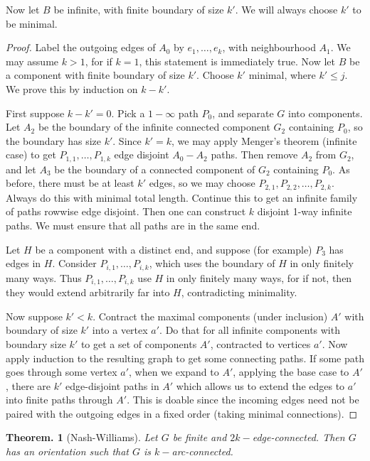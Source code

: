 \documentclass[11pt, a4paper]{memoir}
\theoremstyle{change}
\newtheorem{theorem}{Theorem.}[section]
\theoremstyle{plain}
\theoremstyle{nonumberplain}
\newtheorem{proof}{Proof}
\numberwithin{equation}{section}
\begin{document}
Now let $B$ be infinite, with finite boundary of size $k'$.
We will always choose $k'$ to be minimal.
\begin{proof}
    Label the outgoing edges of $A_0$ by $e_1,\ldots,e_k$, with neighbourhood $A_1$.
    We may assume $k>1$, for if $k=1$, this statement is immediately true.
    Now let $B$ be a component with finite boundary of size $k'$.
    Choose $k'$ minimal, where $k'\leq j$.
    We prove this by induction on $k-k'$.

    First suppose $k-k'=0$.
    Pick a $1-\infty$ path $P_0$, and separate $G$ into components.
    Let $A_2$ be the boundary of the infinite connected component $G_2$ containing $P_0$, so the boundary has size $k'$.
    Since $k'=k$, we may apply Menger's theorem (infinite case) to get $P_{1,1},\ldots,P_{1,k}$ edge disjoint $A_0-A_2$ paths.
    Then remove $A_2$ from $G_2$, and let $A_3$ be the boundary of a connected component of $G_2$ containing $P_0$.
    As before, there must be at least $k'$ edges, so we may choose $P_{2,1},P_{2,2},\ldots,P_{2,k}$.
    Always do this with minimal total length.
    Continue this to get an infinite family of paths rowwise edge disjoint.
    Then one can construct $k$ disjoint 1-way infinite paths.
    We must ensure that all paths are in the same end.

    Let $H$ be a component with a distinct end, and suppose (for example) $P_3$ has edges in $H$.
    Consider $P_{i,1},\ldots,P_{i,k}$, which uses the boundary of $H$ in only finitely many ways.
    Thus $P_{i,1},\ldots,P_{i,k}$ use $H$ in only finitely many ways, for if not, then they would extend arbitrarily far into $H$, contradicting minimality.

    Now suppose $k'<k$.
    Contract the maximal components (under inclusion) $A'$ with boundary of size $k'$ into a vertex $a'$.
    Do that for all infinite components with boundary size $k'$ to get a set of components $A'$, contracted to vertices $a'$.
    Now apply induction to the resulting graph to get some connecting paths.
    If some path goes through some vertex $a'$, when we expand to $A'$, applying the base case to $A'$, there are $k'$ edge-disjoint paths in $A'$ which allows us to extend the edges to $a'$ into finite paths through $A'$.
    This is doable since the incoming edges need not be paired with the outgoing edges in a fixed order (taking minimal connections).
\end{proof}
\begin{theorem}[Nash-Williams]
    Let $G$ be finite and $2k-$edge-connected.
    Then $G$ has an orientation such that $G$ is $k-$arc-connected.
\end{theorem}
\end{document}
